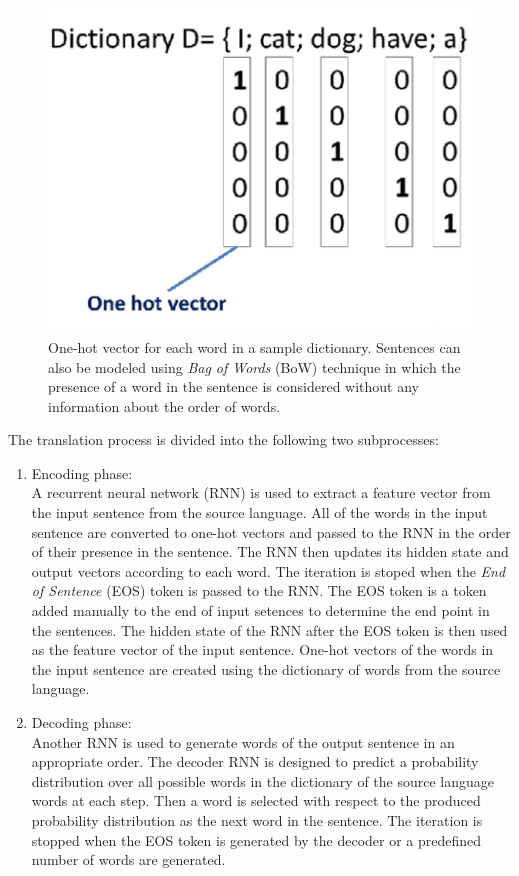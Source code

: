 \documentclass[preprint, 12pt]{elsarticle}
\begin{document}
		\begin{figure}[H]
			\centering
			\includegraphics[scale=0.5]{Imgs/onehot.png}
			\caption{One-hot vector for each word in a sample dictionary. Sentences can also be modeled using \textit{Bag of Words} (BoW) technique in which the presence of a word in the sentence is considered without any information about the order of words.}
			\label{fig:onehot}
		\end{figure}
		
		The translation process is divided into the following two subprocesses:
		\begin{enumerate}
			\item Encoding phase: \\
			A recurrent neural network (RNN) is used to extract a feature vector from the input sentence from the source language. All of the words in the input sentence are converted to one-hot vectors and passed to the RNN in the order of their presence in the sentence. The RNN then updates its hidden state and output vectors according to each word. The iteration is stoped when the \textit{End of Sentence} (EOS) token is passed to the RNN. The EOS token is a token added manually to the end of input setences to determine the end point in the sentences. The hidden state of the RNN after the EOS token is then used as the feature vector of the input sentence. One-hot vectors of the words in the input sentence are created using the dictionary of words from the source language.
			\item Decoding phase: \\
			Another RNN is used to generate words of the output sentence in an appropriate order. The decoder RNN is designed to predict a probability distribution over all possible words in the dictionary of the source language words at each step. Then a word is selected with respect to the produced probability distribution as the next word in the sentence. The iteration is stopped when the EOS token is generated by the decoder or a predefined number of words are generated.
		\end{enumerate}
		
\end{document}
